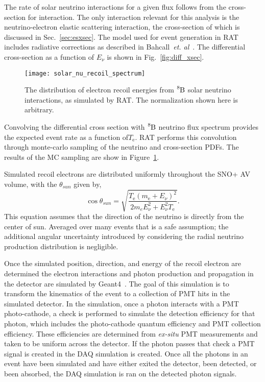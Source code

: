 The rate of solar neutrino interactions for a given flux follows from the cross-section for
interaction. The only interaction relevant for this analysis is the
neutrino-electron elastic scattering interaction, the cross-section of which
is discussed in Sec.~\ref{sec:esxsec}.
The model used for event generation in RAT includes radiative corrections as
described in Bahcall~\textit{et. al}~\citep{escrosssec}.
The differential cross-section as a function of $E_{\nu}$ is shown in Fig.~\ref{fig:diff_xsec}.

\begin{figure}[htbp]
  \centering
  \texttt{[image: solar\_nu\_recoil\_spectrum]}
  \caption[Solar Recoil Electron Spectrum]{
      The distribution of electron recoil energies from $\ce{^{8}B}$ solar neutrino
      interactions, as simulated by RAT. The normalization shown here is arbitrary.}
    \label{fig:recoil_spectrum}
\end{figure}

Convolving the differential cross section with $\ce{^{8}B}$ neutrino flux
spectrum provides the expected event rate as a function of$T_{\mathrm{e}}$. 
RAT performs this convolution through monte-carlo sampling of the neutrino
and cross-section PDFs.
The results of the MC sampling are show in Figure~\ref{fig:recoil_spectrum}.

Simulated recoil electrons are distributed uniformly throughout the SNO+ AV volume, with
the $\theta_{sun}$ given by,
\begin{equation}
  \cos\theta_{sun} = \sqrt{\dfrac{T_{\mathrm{e}}(m_{\mathrm{e}}+E_{\nu})^{2}}{2m_{e}E_{\nu}^{2} + E_{\nu}^{2}T_{\mathrm{e}}}}\text{.}
  \label{eqn:costheta_te}
\end{equation}
This equation assumes that the direction of the neutrino is directly from the center of sun.
Averaged over many events that is a safe assumption; the additional angular uncertainty
introduced by considering the radial neutrino production distribution is negligible.

Once the simulated position, direction, and energy of the recoil electron are determined  the
electron interactions and  photon production and propagation in the detector are simulated
by Geant4~\citep{geant4}.
The goal of this simulation is to transform the kinematics of the event to
a collection of PMT hits in the simulated detector.
In the simulation, once a photon interacts with a PMT photo-cathode, a check is performed
to simulate the detection efficiency for that photon, which includes the photo-cathode quantum efficiency and
PMT collection efficiency.
These efficiencies are determined from \textit{ex-situ} PMT measurements and
taken to be uniform across the detector. %
If the photon passes that check a PMT signal is created in the DAQ simulation is created.
Once all the photons in an event have been simulated and have either exited the detector,
been detected, or been absorbed, the DAQ simulation is ran on the detected photon signals.

